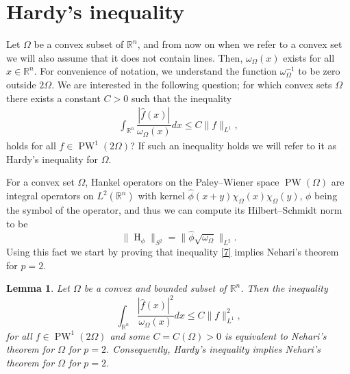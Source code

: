 \documentclass[footinclude=true]{amsart}
\theoremstyle{plain}
\newtheorem{lm}[theo]{Lemma}
\DeclareMathOperator{\Ha}{H}
\DeclareMathOperator{\PW}{PW}
\begin{document}
	\section{Hardy's inequality}\label{sec3}
	Let $\Omega$ be a convex subset of $\mathbb{R}^{n}$, and from now on when we refer to a convex set we will also assume that it does not contain lines. Then, $\omega_{\Omega}(x)$ exists for all $x\in\mathbb{R}^{n}$. For convenience of notation, we understand the function $\omega_{\Omega}^{-1}$ to be zero outside $2\Omega$. We are interested in the following question; for which convex sets $\Omega$ there exists a constant $C>0$ such that the inequality \begin{eqnarray} \label{7}
		\int_{\mathbb{R}^{n}}\dfrac{|\widehat{f}(x)|}{\omega_{\Omega}(x)}dx\leq C\|f\|_{L^{1}},
	\end{eqnarray}
	holds for all $f\in\PW^{1}(2\Omega)$? If such an inequality holds we will refer to it as Hardy's inequality for $\Omega$. 
	\par For a convex set $\Omega$, Hankel operators on the Paley--Wiener space $\PW(\Omega)$ are integral operators on $L^2(\mathbb{R}^n)$ with kernel $\widehat{\phi}(x+y)\chi_{\Omega}(x)\chi_{\Omega}(y)$, $\phi$ being the symbol of the operator, and thus we can compute its Hilbert--Schmidt norm to be 
	$$\|\Ha_\phi\|_{S^2}=\|\widehat{\phi}\sqrt{\omega_{\Omega}}\|_{L^2}.$$
	Using this fact we start by proving that inequality \eqref{7} implies Nehari's theorem for $p=2$. 
	\begin{lm}\label{neh2}
		Let $\Omega$ be a convex and bounded subset of $\mathbb{R}^n$. Then the inequality $$\int_{\mathbb{R}^{n}}\dfrac{|\widehat{f}(x)|^2}{\omega_{\Omega}(x)}dx\leq C\|f\|_{L^{1}}^2,$$ for all $f\in\PW^1(2\Omega)$ and some $C=C(\Omega)>0$ is equivalent to Nehari's theorem for $\Omega$ for $p=2$. Consequently, Hardy's inequality implies Nehari's theorem for $\Omega$ for $p=2$.
	\end{lm}
\end{document}

